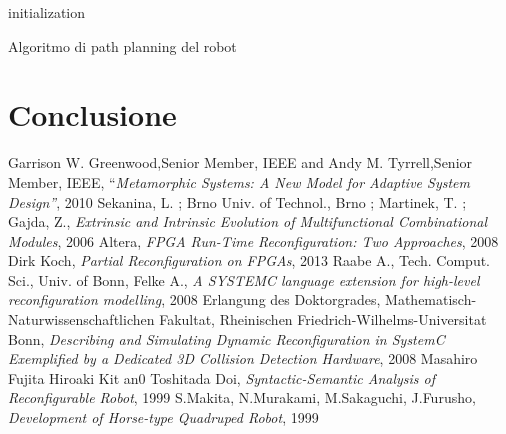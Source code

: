 \documentclass[11pt]{article} %
\begin{document}
\begin{algorithm}[H]
 initialization\;
\caption{Algoritmo di path planning del robot}
\end{algorithm}

\section{Conclusione}



\begin{thebibliography}{1}
 Garrison W. Greenwood,Senior Member, IEEE and Andy M. Tyrrell,Senior Member, IEEE, ``\textit{Metamorphic Systems: A New Model for Adaptive System Design''}, 2010
 Sekanina, L. ; Brno Univ. of Technol., Brno ; Martinek, T. ; Gajda, Z., \textit{Extrinsic and Intrinsic Evolution of Multifunctional Combinational Modules}, 2006
 Altera, \textit{FPGA Run-Time Reconfiguration: Two Approaches}, 2008
 Dirk Koch, \textit{Partial Reconfiguration on FPGAs}, 2013
 Raabe A., Tech. Comput. Sci., Univ. of Bonn, Felke A., \textit{A SYSTEMC language extension for high-level reconfiguration modelling}, 2008
 Erlangung des Doktorgrades, Mathematisch-Naturwissenschaftlichen Fakultat, Rheinischen Friedrich-Wilhelms-Universitat Bonn, \textit{Describing and Simulating Dynamic Reconfiguration in SystemC Exemplified by a Dedicated 3D Collision Detection Hardware}, 2008
 Masahiro Fujita Hiroaki Kit an0 Toshitada Doi, \textit{Syntactic-Semantic Analysis of Reconfigurable Robot}, 1999
 S.Makita, N.Murakami, M.Sakaguchi, J.Furusho, \textit{Development of Horse-type Quadruped Robot}, 1999
\end{thebibliography}
\end{document}
